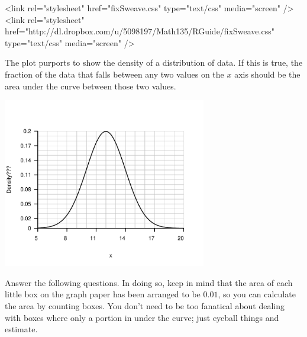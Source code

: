 



\providecommand{\HCode}[1]{#1} %
\HCode{<link rel="stylesheet" href="fixSweave.css" type="text/css"
  media="screen" />}
\HCode{<link rel="stylesheet" href="http://dl.dropbox.com/u/5098197/Math135/RGuide/fixSweave.css" type="text/css"
 media="screen" />}


The plot purports to show the density of a distribution of data.  If this is
true, the fraction of the data that falls between any two values on
the $x$ axis should be the area under the curve between those two
values.


\centerline{\includegraphics[width=3.5in]{Figures/B106-plot1}}

Answer the following questions. In doing so, keep in mind that the area of each
little box on the graph paper has been arranged to be $0.01$, so you
can calculate the area by counting boxes.  You don't need to be too
fanatical about dealing with boxes where only a portion in under the
curve; just eyeball things and estimate.

